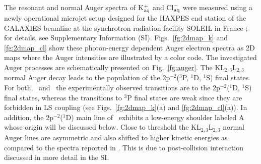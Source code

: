 The resonant and normal Auger spectra of K$^+_{\rm aq}$ and Cl$^-_{\rm aq}$ were measured using a newly operational microjet setup designed for the HAXPES end station of the GALAXIES beamline at the synchrotron radiation facility SOLEIL in France \citep{ceolin13:188,rueff15:175}; for details, see Supplementary Information (SI). {\color{blue} Figs.\ \ref{fg:2dmap_k} and \ref{fg:2dmap_cl} show these photon-energy dependent Auger electron spectra as 2D maps where %
the Auger intensities are illustrated by a color code.} The investigated Auger processes are schematically presented on Fig.\ \ref{fg:auger}. The KL$_{2,3}$L$_{2,3}$ normal Auger decay {\color{blue} leads to the population of the 2p$^{-2}$($^3$P, $^1$D, $^1$S) final states. For both, \ki~and \cli~the experimentally observed transitions are to the 2p$^{-2}$($^1$D, $^1$S) final states, {\color{red}whereas the transitions to $^3$P final states are weak since they are forbidden in LS coupling (see Figs.\ \ref{fg:2dmap_k}(a) and  \ref{fg:2dmap_cl}(a)).} In addition, the 2p$^{-2}$($^1$D) main line of \ki~exhibits a low-energy shoulder labeled A whose origin will be discussed below. Close to threshold the KL$_{2,3}$L$_{2,3}$ normal Auger lines are asymmetric and also shifted to higher kinetic energies as compared to the spectra reported in \citep{ceolin17:263003}. This is due to post-collision interaction \citep{russek86:911,guillemin15:012503} discussed in more detail in the SI. }



